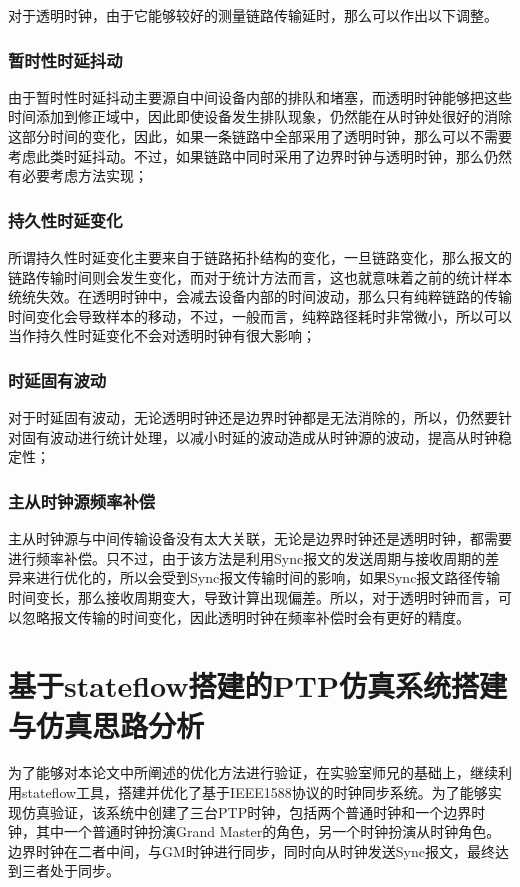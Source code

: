 对于透明时钟，由于它能够较好的测量链路传输延时，那么可以作出以下调整。
\subsubsection{暂时性时延抖动}
由于暂时性时延抖动主要源自中间设备内部的排队和堵塞，而透明时钟能够把这些时间添加到修正域中，因此即使设备发生排队现象，仍然能在从时钟处很好的消除这部分时间的变化，因此，如果一条链路中全部采用了透明时钟，那么可以不需要考虑此类时延抖动。不过，如果链路中同时采用了边界时钟与透明时钟，那么仍然有必要考虑方法实现；

\subsubsection{持久性时延变化}
所谓持久性时延变化主要来自于链路拓扑结构的变化，一旦链路变化，那么报文的链路传输时间则会发生变化，而对于统计方法而言，这也就意味着之前的统计样本统统失效。在透明时钟中，会减去设备内部的时间波动，那么只有纯粹链路的传输时间变化会导致样本的移动，不过，一般而言，纯粹路径耗时非常微小，所以可以当作持久性时延变化不会对透明时钟有很大影响；

\subsubsection{时延固有波动}
对于时延固有波动，无论透明时钟还是边界时钟都是无法消除的，所以，仍然要针对固有波动进行统计处理，以减小时延的波动造成从时钟源的波动，提高从时钟稳定性；

\subsubsection{主从时钟源频率补偿}
主从时钟源与中间传输设备没有太大关联，无论是边界时钟还是透明时钟，都需要进行频率补偿。只不过，由于该方法是利用Sync报文的发送周期与接收周期的差异来进行优化的，所以会受到Sync报文传输时间的影响，如果Sync报文路径传输时间变长，那么接收周期变大，导致计算出现偏差。所以，对于透明时钟而言，可以忽略报文传输的时间变化，因此透明时钟在频率补偿时会有更好的精度。

\section{基于stateflow搭建的PTP仿真系统搭建与仿真思路分析}
为了能够对本论文中所阐述的优化方法进行验证，在实验室师兄的基础上，继续利用stateflow工具，搭建并优化了基于IEEE1588协议的时钟同步系统。为了能够实现仿真验证，该系统中创建了三台PTP时钟，包括两个普通时钟和一个边界时钟，其中一个普通时钟扮演Grand Master的角色，另一个时钟扮演从时钟角色。边界时钟在二者中间，与GM时钟进行同步，同时向从时钟发送Sync报文，最终达到三者处于同步。


